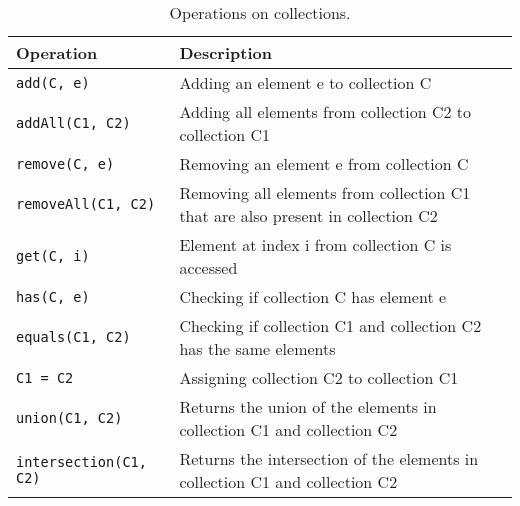 \begin{table*}[ht!] \centering \small
\caption{Operations on collections.}
\label{tab:operations}
\begin{tabular}{|l|l|}
\hline 
\textbf{Operation} & \textbf{Description}\\\hline
\lstinline|add(C, e)| & Adding an element e to collection C \\\hline
\lstinline|addAll(C1, C2)| & Adding all elements from collection C2 to collection
C1\\\hline 
\lstinline|remove(C, e)| & Removing an element e from collection C \\\hline 
\lstinline|removeAll(C1, C2)| & Removing all elements from collection C1 that are
also present in collection C2\\\hline 
\lstinline|get(C, i)| & Element at index i from collection C is accessed\\\hline
\lstinline|has(C, e)| & Checking if collection C has element e\\\hline
\lstinline|equals(C1, C2)| & Checking if collection C1 and collection C2 has the
same elements\\\hline 
\lstinline|C1 = C2| & Assigning collection C2 to collection C1\\\hline
\lstinline|union(C1, C2)| & Returns the union of the elements in collection C1 and
collection C2\\\hline 
\lstinline|intersection(C1, C2)| & Returns the intersection of the elements in collection C1 and collection C2\\\hline
\end{tabular}
\end{table*}
